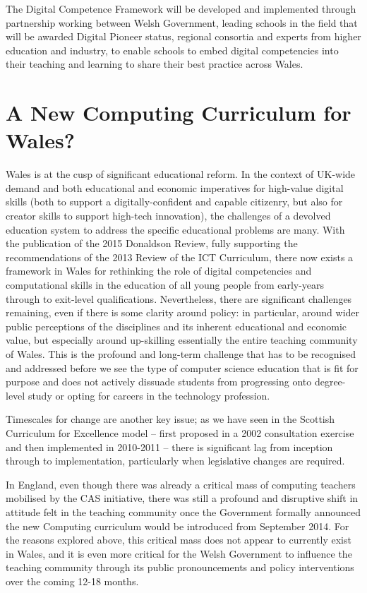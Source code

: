 \documentclass{sig-alternate}
\begin{document}
The Digital Competence Framework will be developed and implemented
through partnership working between Welsh Government, leading schools
in the field that will be awarded Digital Pioneer status, regional
consortia and experts from higher education and industry, to enable
schools to embed digital competencies into their teaching and learning
to share their best practice across Wales.

\section{A New Computing Curriculum for Wales?}\label{conclusions}


Wales is at the cusp of
significant educational reform. In the context of UK-wide demand and
both educational and economic imperatives for high-value digital
skills (both to support a digitally-confident and capable citizenry,
but also for creator skills to support high-tech innovation), the
challenges of a devolved education system to address the specific
educational problems are many. With the publication of the 2015
Donaldson Review, fully supporting the recommendations of the 2013
Review of the ICT Curriculum, there now exists a framework in Wales for
rethinking the role of digital competencies and computational skills
in the education of all young people from early-years through to
exit-level qualifications. Nevertheless, there are significant challenges
remaining, even if there is some clarity around policy: in particular,
around wider public perceptions of the disciplines and its inherent
educational and economic value, but especially around up-skilling
essentially the entire teaching community of Wales. This is the
profound and long-term challenge that has to be recognised and
addressed before we see the type of computer science education that is
fit for purpose and does not actively dissuade students from
progressing onto degree-level study or opting for careers in the
technology profession.

Timescales for change are another key issue; as we have seen in the
Scottish Curriculum for Excellence model -- first proposed in a 2002
consultation exercise and then implemented in 2010-2011 -- there is
significant lag from inception through to implementation, particularly
when legislative changes are required.

In England, even though there was already a critical mass of computing
teachers mobilised by the CAS initiative, there was still a profound
and disruptive shift in attitude felt in the teaching community once
the Government formally announced the new Computing curriculum would
be introduced from September 2014.  For the reasons explored above,
this critical mass does not appear to currently exist in Wales, and it
is even more critical for the Welsh Government to influence the
teaching community through its public pronouncements and policy
interventions over the coming 12-18 months.
\end{document}
